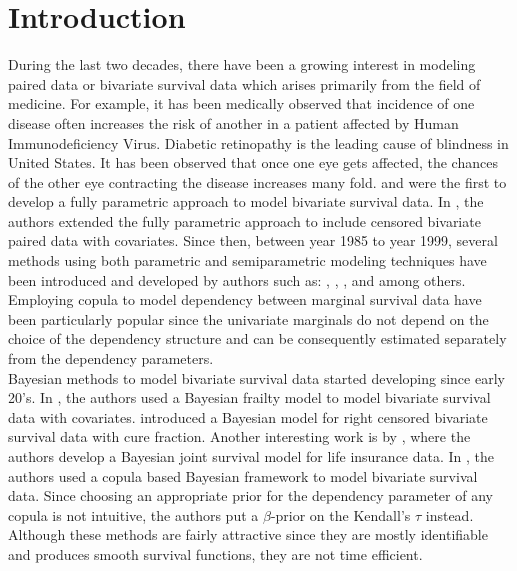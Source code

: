 \documentclass[11pt]{article}
\theoremstyle{remboldstyle}
\begin{document}
\section{Introduction}
\label{sec:intr}
\noindent
During the last two decades, there have been a growing interest in modeling paired data or bivariate survival data which arises primarily from the field of medicine. For example, it has been medically observed that incidence of one disease often increases the risk of another in a patient affected by Human Immunodeficiency Virus. Diabetic retinopathy is the leading cause of blindness in United States. It has been observed that once one eye gets affected, the chances of the other eye contracting the disease increases many fold. \cite{clayton:1978} and \cite{oakes:1982} were the first to develop a fully parametric approach to model bivariate survival data. In \cite{huster:brookmeyer:self:1989}, the authors extended the fully parametric approach to include censored bivariate paired data with covariates. Since then, between year 1985 to year 1999, several methods using both parametric and semiparametric modeling techniques have been introduced and developed by authors such as: \cite{nelson:1986}, \cite{oakes:1986}, \cite{shih:louis:1995}, \cite{genest:1993} and \cite{wang:wells:2000} among others. Employing copula to model dependency between marginal survival data have been particularly popular since the univariate marginals do not depend on the choice of the dependency structure and can be consequently estimated separately from the dependency parameters.\\
Bayesian methods to model bivariate survival data started developing since early 20's. In \cite{sahu:dey:2000}, the authors used a Bayesian frailty model to model bivariate survival data with covariates. \cite{chen:ibra:sinh:2002} introduced a Bayesian model for right censored bivariate survival data with cure fraction. Another interesting work is by \cite{shem:youn:2000}, where the authors develop a Bayesian joint survival model for life insurance data. In \cite{romeo:tanaka:2006}, the authors used a copula based Bayesian framework to model bivariate survival data. Since choosing an appropriate prior for the dependency parameter of any copula is not intuitive, the authors put a $\beta$-prior on the Kendall's $\tau$ instead. Although these methods are fairly attractive since they are mostly identifiable and produces smooth survival functions, they are not time efficient.
\end{document}
